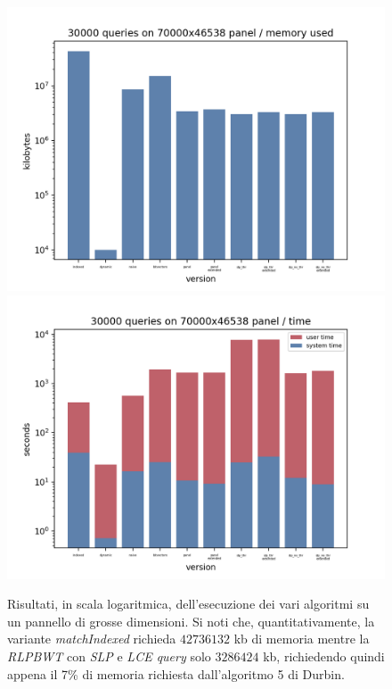 \begin{figure}
  \centering
  \includegraphics[scale = 0.4]{img/mem.png}
  \includegraphics[scale = 0.4]{img/time.png}
  \caption{Risultati, in scala logaritmica, dell'esecuzione dei vari algoritmi
    su un pannello di grosse dimensioni. Si noti che, quantitativamente, la
    variante \textit{matchIndexed} richieda $42736132$ kb di memoria mentre la
    \textit{RLPBWT} con \textit{SLP} e \textit{LCE query} solo $3286424$ kb,
    richiedendo quindi appena il 7\% di memoria richiesta dall'algoritmo 5 di
    Durbin.} 
  \label{fig:bigres}
\end{figure}